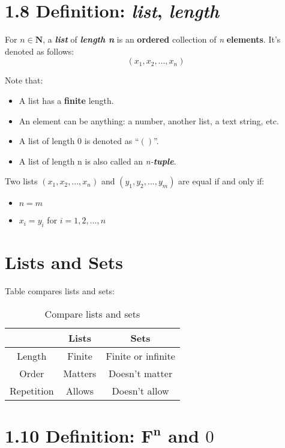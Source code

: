 \documentclass[12pt, letterpaper, oneside]{book}
\begin{document}
\section*{1.8 Definition: \textit{list}, \textit{length}}

For $n \in \mathbf{N}$, a \textbf{\textit{list}} of \textbf{\textit{length n}}
is an \textbf{ordered} collection of \textit{n} \textbf{elements}. It's denoted
as follows: \[ (x_1, x_2, ..., x_n) \]

Note that:
\begin{itemize}
  \item A list has a \textbf{finite} length.
  \item An element can be anything: a number, another list, a text string, etc.
  \item A list of length 0 is denoted as ``$()$''.
  \item A list of length n is also called an \textit{n-\textbf{tuple}}.
\end{itemize}

Two lists $(x_1, x_2, ..., x_n)$ and $(y_1, y_2, ..., y_m)$ are equal if and
only if:
\begin{itemize}
  \item $n = m$
  \item $x_i = y_i$ for $i = 1, 2, ..., n$
\end{itemize}

\section*{Lists and Sets}

Table compares lists and sets:
\begin{table}[ht!]
\centering
\begin{tabular}{||c c c ||} 
 \hline
   & Lists & Sets \\ [0.5ex] 
 \hline
 \hline
 Length & Finite & Finite or infinite \\ 
 Order & Matters & Doesn't matter \\
 Repetition & Allows & Doesn't allow \\ [1ex]
 \hline
\end{tabular}
\caption{Compare lists and sets}
\label{table:lists_sets_comp}
\end{table}

\section*{1.10 Definition: $\mathbf{F^n}$ and $0$}
\end{document}
